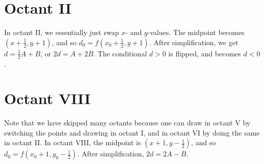 \documentclass[12pt,letterpaper]{article}
\begin{document}
\section{Octant II}
In octant II, we essentially just swap $x$- and $y$-values.
The midpoint becomes $\left(x + \frac{1}{2}, y + 1\right)$, and so $d_0 = f\left(x_0 + \frac{1}{2}, y + 1\right)$.
After simplification, we get $d = \frac{1}{2} A + B$, or $2d = A + 2B$.
The conditional $d > 0$ is flipped, and becomes $d < 0$.

\section{Octant VIII}
Note that we have skipped many octants because one can draw in octant V by switching the points and drawing in octant I, and in octant VI by doing the same in octant II\@.
In octant VIII, the midpoint is $\left(x + 1, y - \frac{1}{2}\right)$, and so $d_0 = f\left(x_0 + 1, y_0 - \frac{1}{2}\right)$.
After simplification, $2d = 2A - B$.
\end{document}
